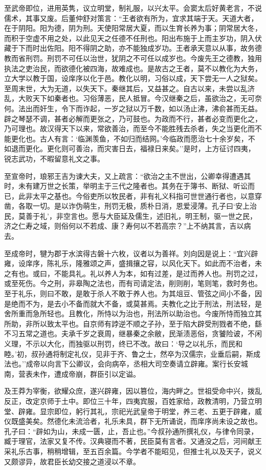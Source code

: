 \documentclass[]{article}
\begin{document}
至武帝即位，进用英隽，议立明堂，制礼服，以兴太平。会窦太后好黄老言，不说儒术，其事又废。后董仲舒对策言：``王者欲有所为，宜求其端于天。天道大者，在于阴阳。阳为德，阴为刑。天使阳常居大夏，而以生育长养为事；阴常居大冬，而积于空虚不用之处，以此见天之任德不任刑也。阳出布施于上而主岁功，阴入伏藏于下而时出佐阳。阳不得阴之助，亦不能独成岁功。王者承天意以从事，故务德教而省刑罚。刑罚不可任以治世，犹阴之不可任以成岁也。今废先王之德教，独用执法之吏治民，而欲德化被四海，故难成也。是故古之王者，莫不以教化为大务，立大学以教于国，设庠序以化于邑。教化以明，习俗以成，天下尝无一人之狱矣。至周末世，大为无道，以失天下。秦继其后，又益甚之。自古以来，未尝以乱济乱，大败天下如秦者也。习俗薄恶，民人抵冒。今汉继秦之后，虽欲治之，无可奈何。法出而奸生，令下而诈起，一岁之狱以万千数，如以汤止沸，沸俞甚而无益。辟之琴瑟不调，甚者必解而更张之，乃可鼓也。为政而不行，甚者必变而更化之，乃可理也。故汉得天下以来，常欲善治，而至今不能胜残去杀者，失之当更化而不能更化也。古人有言：`临渊羡鱼，不如归而结网。'今临政而愿治七十余岁矣，不如退而更化。更化则可善治，而灾害日去，福禄日来矣。''是时，上方征讨四夷，锐志武功，不暇留意礼文之事。

至宣帝时，琅邪王吉为谏大夫，又上疏言：``欲治之主不世出，公卿幸得遭遇其时，未有建万世之长策，举明主于三代之隆者也。其务在于簿书、断狱、听讼而已，此非太平之基也。今俗吏所以牧民者，非有礼义科指可世世通行者也，以意穿凿，各取一切。是以诈伪萌生，刑罚无极，质朴日消，恩爱浸薄。孔子曰`安上治民，莫善于礼'，非空言也。愿与大臣延及儒生，述旧礼，明王制，驱一世之民，济之仁寿之域，则俗何以不若成、康？寿何以不若高宗？''上不纳其言，吉以病去。

至成帝时，犍为郡于水滨得古磐十六枚，议者以为善祥。刘向因是说上：``宜兴辟雍，设庠序，陈礼乐，隆雅颂之声，盛揖攘之容，以风化天下。如此而不治者，未之有也。或曰，不能具礼。礼以养人为本，如有过差，是过而养人也。刑罚之过，或至死伤。今之刑，非皋陶之法也，而有司请定法，削则削，笔则笔，救时务也。至于礼乐，则曰不敢，是敢于杀人不敢于养人也。为其俎豆、管弦之间小不备，因是绝而不为，是去小不备而就大不备，或莫甚焉。夫教化之比于刑法，刑法轻，是舍所重而急所轻也。且教化，所恃以为治也，刑法所以助治也。今废所恃而独立其所助，非所以致太平也。自京师有誖逆不顺之子孙，至于陷大辟受刑戮者不绝，繇不习五常之道也。夫承千岁之衰周，继暴秦之余敝，民渐渍恶俗，贪饕险诐，不闲义理，不示以大化，而独驱以刑罚，终已不改。故曰：`导之以礼乐，而民和睦。'初，叔孙通将制定礼仪，见非于齐、鲁之士，然卒为汉儒宗，业垂后嗣，斯成法也。''成帝以向言下公卿议，会向病卒，丞相大司空奏请立辟雍。案行长安城南，营表未作，遭成帝崩，群臣引以定谥。

及王莽为宰衡，欲耀众庶，遂兴辟雍，因以篡位，海内畔之。世祖受命中兴，拨乱反正，改定京师于土中。即位三十年，四夷宾服，百姓家给，政教清明，乃营立明堂、辟雍。显宗即位，躬行其礼，宗祀光武皇帝于明堂，养三老、五更于辟雍，威仪既盛美矣。然德化未流洽者，礼乐未具，群下无所诵说，而庠序尚未设之故也。孔子曰：``辟如为山，未成一匮，止，吾止也。''今叔孙通所撰礼仪，与律令同录，臧于理官，法家又复不传。汉典寝而不著，民臣莫有言者。又通没之后，河间献王采礼乐古事，稍稍增辑，至五百余篇。今学者不能昭见，但推士礼以及天子，说义又颇谬异，故君臣长幼交接之道浸以不章。
\end{document}
